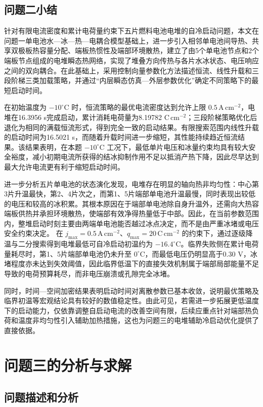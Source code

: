 \documentclass[bwprint]{gmcmthesis}
\numberwithin{figure}{section}
\begin{document}
\subsection{问题二小结}
针对有限电流密度和累计电荷量约束下五片燃料电池电堆的自冷启动问题，本文在问题一单电池水—冰—热—电耦合模型基础上，进一步引入相邻单电池间导热、共享双极板热容量分配、端板热惯性及端部环境散热，建立了由5个单电池节点和2个端板节点组成的电堆瞬态热网络，实现了堆叠方向传热与各片水冰状态、电压响应之间的双向耦合。在此基础上，采用控制向量参数化方法描述恒流、线性升载和三段阶梯三类加载策略，并通过“内层瞬态仿真—外层参数优化”确定不同策略下的最短启动时间。

在初始温度为 \(-10^\circ\mathrm C\) 时，恒流策略的最优电流密度达到允许上限 \(0.5\,\mathrm{A\,cm^{-2}}\)，电堆在16.3956 s完成启动，累计消耗电荷量为8.19782 \(\mathrm{C\,cm^{-2}}\)；三段阶梯策略优化后退化为相同的满载恒流形式，得到完全一致的启动结果。有限搜索范围内线性升载的启动时间为16.5021 s，而随着升载时间进一步缩短，其性能持续趋近恒流结果。该结果表明，在本题 \(-10^\circ\mathrm C\) 工况下，最低单片电压和冰量约束均具有较大安全裕度，减小初期电流所获得的结冰抑制作用不足以抵消产热下降，因此尽早达到最大允许电流更有利于缩短启动时间。

进一步分析五片单电池的状态演化发现，电堆存在明显的轴向热非均匀性：中心第3片升温最快，第2、4片次之，而第1、5片端部单电池升温最慢，同时表现出较低的电压和较高的冰积累。其根本原因在于端部单电池除自身升温外，还需向大热容端板供热并承担环境散热，使端部有效净得热量低于中部。因此，在当前参数范围内，整堆启动时刻主要由两端单电池能否越过冰点决定，而不是由严重冰堵或电压安全约束决定。
在 \(j_{\max}=0.5\,\mathrm{A\,cm^{-2}}\)、\(q_{\max}=20\,\mathrm{C\,cm^{-2}}\) 的约束下，通过逐级降温与二分搜索得到电堆最低可自冷启动初温约为 \(-16.4^\circ\mathrm C\)。临界失败侧在累计电荷量耗尽时，第1、5片端部单电池仍未升至 \(0^\circ\mathrm C\)，而最低电压仍明显高于0.30 V，冰堵程度亦未达到失效阈值，因此临界低温下的直接失效机制属于端部局部能量不足导致的电荷预算耗尽，而非电压崩溃或孔隙完全冰堵。

同时，时间—空间加密结果表明启动时间对离散参数已基本收敛，说明最优策略及临界初温等宏观结论具有较好的数值稳定性。由此可见，若需进一步拓展更低温度下的启动能力，仅依靠调整自启动电流的改善空间有限，后续应重点针对端部热负荷和温度非均匀性引入辅助加热措施，这也为问题三的电堆辅助冷启动优化提供了直接依据。

\section{问题三的分析与求解}
\subsection{问题描述和分析}
\end{document}
